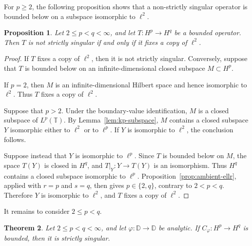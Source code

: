 \documentclass[11pt, reqno]{amsart}
\newtheorem{theorem}{Theorem}[section]
\newtheorem{proposition}[theorem]{Proposition}
\theoremstyle{definition}
\theoremstyle{remark}
\newcommand{\D}{\mathbb{D}}
\newcommand{\T}{\mathbb{T}}
\begin{document}
For \(p\ge2\), the following proposition shows that a non-strictly
singular operator is bounded below on a subspace isomorphic to
\(\ell^2\).

\begin{proposition}
\label{prop:ss-criterion}
Let \(2\le p<q<\infty\), and let
\(T:H^p\to H^q\) be a bounded operator. Then \(T\) is not strictly
singular if and only if it fixes a copy of \(\ell^2\).
\end{proposition}

\begin{proof}
If \(T\) fixes a copy of \(\ell^2\), then it is not strictly singular.
Conversely, suppose that \(T\) is bounded below on an
infinite-dimensional closed subspace \(M\subset H^p\).

If \(p=2\), then \(M\) is an infinite-dimensional Hilbert space and
hence isomorphic to \(\ell^2\). Thus \(T\) fixes a copy of \(\ell^2\).

Suppose that \(p>2\). Under the boundary-value identification,
\(M\) is a closed subspace of \(L^p(\T)\). By
Lemma~\ref{lem:kp-subspace}, \(M\) contains a closed
subspace \(Y\) isomorphic either to \(\ell^2\) or to \(\ell^p\). If
\(Y\) is isomorphic to \(\ell^2\), the conclusion follows.

Suppose instead that \(Y\) is isomorphic to \(\ell^p\). Since \(T\)
is bounded below on \(M\), the space \(T(Y)\) is closed in \(H^q\), and
\(T|_Y\colon Y\to T(Y)\) is an isomorphism.
Thus \(H^q\) contains a closed subspace isomorphic
to \(\ell^p\). Proposition~\ref{prop:ambient-ellr}, applied with
\(r=p\) and \(s=q\), then gives \(p\in\{2,q\}\), contrary to
\(2<p<q\). Therefore \(Y\) is isomorphic to \(\ell^2\), and \(T\)
fixes a copy of \(\ell^2\).
\end{proof}

It remains to consider \(2\le p<q\).

\begin{theorem}
\label{thm:ss-above2}
Let \(2\le p<q<\infty\), and let \(\varphi:\D\to\D\) be analytic.
If \(C_\varphi:H^p\to H^q\) is bounded, then it is strictly singular.
\end{theorem}
\end{document}
